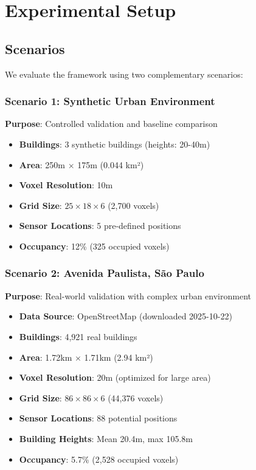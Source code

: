 
\section{Experimental Setup}

\subsection{Scenarios}

We evaluate the framework using two complementary scenarios:

\subsubsection{Scenario 1: Synthetic Urban Environment}

\textbf{Purpose}: Controlled validation and baseline comparison

\begin{itemize}
\item \textbf{Buildings}: 3 synthetic buildings (heights: 20-40m)
\item \textbf{Area}: 250m $\times$ 175m (0.044 km²)
\item \textbf{Voxel Resolution}: 10m
\item \textbf{Grid Size}: $25 \times 18 \times 6$ (2,700 voxels)
\item \textbf{Sensor Locations}: 5 pre-defined positions
\item \textbf{Occupancy}: 12\% (325 occupied voxels)
\end{itemize}

\subsubsection{Scenario 2: Avenida Paulista, São Paulo}

\textbf{Purpose}: Real-world validation with complex urban environment

\begin{itemize}
\item \textbf{Data Source}: OpenStreetMap (downloaded 2025-10-22)
\item \textbf{Buildings}: 4,921 real buildings
\item \textbf{Area}: 1.72km $\times$ 1.71km (2.94 km²)
\item \textbf{Voxel Resolution}: 20m (optimized for large area)
\item \textbf{Grid Size}: $86 \times 86 \times 6$ (44,376 voxels)
\item \textbf{Sensor Locations}: 88 potential positions
\item \textbf{Building Heights}: Mean 20.4m, max 105.8m
\item \textbf{Occupancy}: 5.7\% (2,528 occupied voxels)
\end{itemize}

